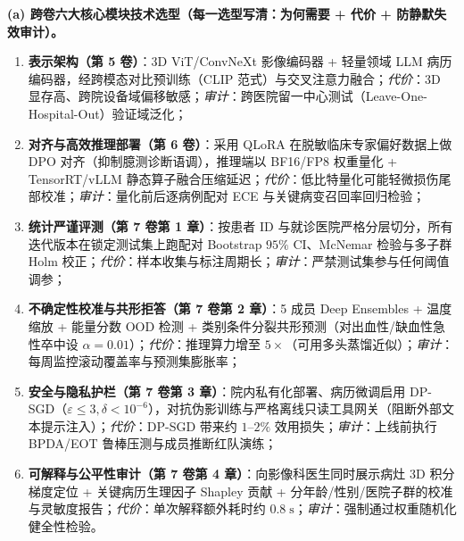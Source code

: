\textbf{(a) 跨卷六大核心模块技术选型（每一选型写清：为何需要 + 代价 + 防静默失效审计）。}
\begin{enumerate}
  \item \textbf{表示架构（第 5 卷）}：3D ViT/ConvNeXt 影像编码器 + 轻量领域 LLM 病历编码器，经跨模态对比预训练（CLIP 范式）与交叉注意力融合；\emph{代价}：3D 显存高、跨院设备域偏移敏感；\emph{审计}：跨医院留一中心测试（Leave-One-Hospital-Out）验证域泛化；
  \item \textbf{对齐与高效推理部署（第 6 卷）}：采用 QLoRA 在脱敏临床专家偏好数据上做 DPO 对齐（抑制臆测诊断语调），推理端以 BF16/FP8 权重量化 + TensorRT/vLLM 静态算子融合压缩延迟；\emph{代价}：低比特量化可能轻微损伤尾部校准；\emph{审计}：量化前后逐病例配对 ECE 与关键病变召回率回归检验；
  \item \textbf{统计严谨评测（第 7 卷第 1 章）}：按患者 ID 与就诊医院严格分层切分，所有迭代版本在锁定测试集上跑配对 Bootstrap $95\%$ CI、McNemar 检验与多子群 Holm 校正；\emph{代价}：样本收集与标注周期长；\emph{审计}：严禁测试集参与任何阈值调参；
  \item \textbf{不确定性校准与共形拒答（第 7 卷第 2 章）}：5 成员 Deep Ensembles + 温度缩放 + 能量分数 OOD 检测 + 类别条件分裂共形预测（对出血性/缺血性急性卒中设 $\alpha = 0.01$）；\emph{代价}：推理算力增至 $5\times$（可用多头蒸馏近似）；\emph{审计}：每周监控滚动覆盖率与预测集膨胀率；
  \item \textbf{安全与隐私护栏（第 7 卷第 3 章）}：院内私有化部署、病历微调启用 DP-SGD（$\varepsilon \le 3, \delta < 10^{-6}$），对抗伪影训练与严格离线只读工具网关（阻断外部文本提示注入）；\emph{代价}：DP-SGD 带来约 $1\text{--}2\%$ 效用损失；\emph{审计}：上线前执行 BPDA/EOT 鲁棒压测与成员推断红队演练；
  \item \textbf{可解释与公平性审计（第 7 卷第 4 章）}：向影像科医生同时展示病灶 3D 积分梯度定位 + 关键病历生理因子 Shapley 贡献 + 分年龄/性别/医院子群的校准与灵敏度报告；\emph{代价}：单次解释额外耗时约 $0.8\;\mathrm{s}$；\emph{审计}：强制通过权重随机化健全性检验。
\end{enumerate}


